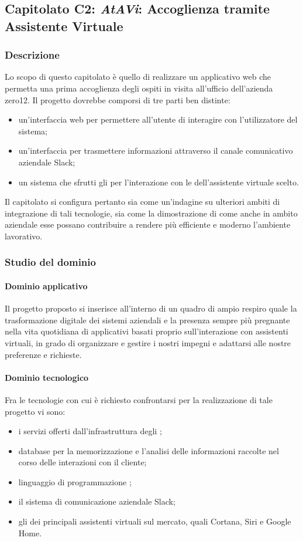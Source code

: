 	\subsection{Capitolato C2: \emph{AtAVi}: Accoglienza tramite Assistente Virtuale}
		\subsubsection{Descrizione}
		Lo scopo di questo capitolato è quello di realizzare un applicativo web che permetta una prima accoglienza degli ospiti in visita all'ufficio 
		dell'azienda zero12. Il progetto dovrebbe comporsi di tre parti ben distinte: 
		\begin{itemize}
			\item un'interfaccia web per permettere all'utente di interagire con l'utilizzatore del sistema;
			\item un'interfaccia per trasmettere informazioni attraverso il canale comunicativo aziendale Slack;
			\item un sistema che sfrutti gli  per l'interazione con le  dell'assistente virtuale scelto.
		\end{itemize}
		Il capitolato si configura pertanto sia come un'indagine su ulteriori ambiti di integrazione di tali tecnologie, sia come la dimostrazione 
		di come anche in ambito aziendale esse possano contribuire a rendere più efficiente e moderno l'ambiente lavorativo.
		\subsubsection{Studio del dominio}
			\paragraph{Dominio applicativo}
			Il progetto proposto si inserisce all'interno di un quadro di ampio respiro quale la trasformazione digitale dei sistemi aziendali e la 
			presenza sempre più pregnante nella vita quotidiana di applicativi basati proprio sull'interazione con assistenti virtuali, in grado di 
			organizzare e gestire i nostri impegni e adattarsi alle nostre preferenze e richieste.
			
			\paragraph{Dominio tecnologico}
			Fra le tecnologie con cui è richiesto confrontarsi per la realizzazione di tale progetto vi sono:
			\begin{itemize}
				\item i servizi offerti dall'infrastruttura degli ;
				\item database  per la memorizzazione e l'analisi delle informazioni raccolte nel corso delle interazioni con il cliente;
				\item linguaggio di programmazione ;
				\item il sistema di comunicazione aziendale Slack;
				\item gli  dei principali assistenti virtuali sul mercato, quali Cortana, Siri e Google Home.
			\end{itemize}
